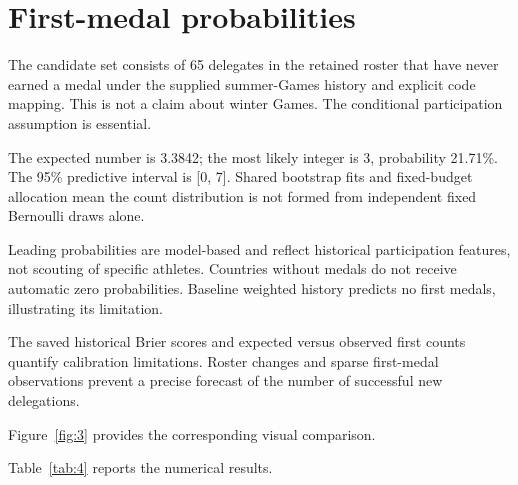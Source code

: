 \documentclass[11pt,a4paper]{article}
\begin{document}
\section{First-medal probabilities}
The candidate set consists of 65 delegates in the retained roster that have never earned a medal under the supplied summer-Games history and explicit code mapping. This is not a claim about winter Games. The conditional participation assumption is essential.

The expected number is 3.3842; the most likely integer is 3, probability 21.71\%. The 95\% predictive interval is [0, 7]. Shared bootstrap fits and fixed-budget allocation mean the count distribution is not formed from independent fixed Bernoulli draws alone.

Leading probabilities are model-based and reflect historical participation features, not scouting of specific athletes. Countries without medals do not receive automatic zero probabilities. Baseline weighted history predicts no first medals, illustrating its limitation.

The saved historical Brier scores and expected versus observed first counts quantify calibration limitations. Roster changes and sparse first-medal observations prevent a precise forecast of the number of successful new delegations.

Figure~\ref{fig:3} provides the corresponding visual comparison.

Table~\ref{tab:4} reports the numerical results.
\end{document}
